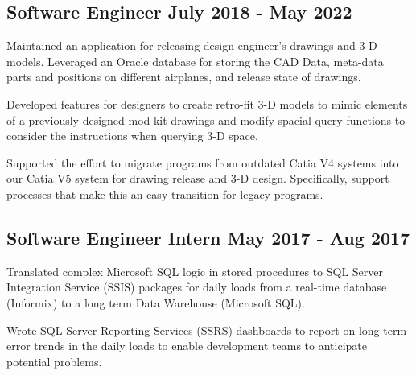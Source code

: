 \subsection{{Software Engineer \hfill July 2018 - May 2022}}
\begin{zitemize}
\item Maintained an application for releasing design engineer's drawings and 3-D models. Leveraged an Oracle database for storing the CAD Data, meta-data parts and positions on different airplanes, and release state of drawings.
\item Developed features for designers to create retro-fit 3-D models to mimic elements of a previously designed mod-kit drawings and modify spacial query functions to consider the instructions when querying 3-D space.
\item Supported the effort to migrate programs from outdated Catia V4 systems into our Catia V5 system for drawing release and 3-D design. Specifically, support processes that make this an easy transition for legacy programs.
\end{zitemize}

\subsection{{Software Engineer Intern \hfill May 2017 - Aug 2017}}
\begin{zitemize}
\item Translated complex Microsoft SQL logic in stored procedures to SQL Server Integration Service (SSIS) packages for daily loads from a real-time database (Informix) to a long term Data Warehouse (Microsoft SQL).
\item Wrote SQL Server Reporting Services (SSRS) dashboards to report on long term error trends in the daily loads to enable development teams to anticipate potential problems.
\end{zitemize}


